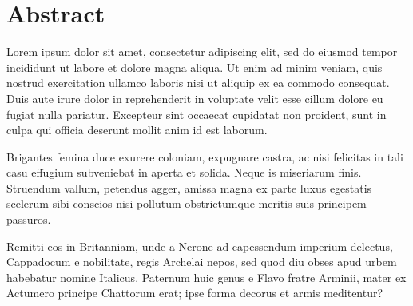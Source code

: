 \section*{\centering Abstract}
\vspace{5mm}

Lorem ipsum dolor sit amet, consectetur adipiscing elit, sed do eiusmod tempor incididunt ut labore et dolore magna aliqua. Ut enim ad minim veniam, quis nostrud exercitation ullamco laboris nisi ut aliquip ex ea commodo consequat. Duis aute irure dolor in reprehenderit in voluptate velit esse cillum dolore eu fugiat nulla pariatur. Excepteur sint occaecat cupidatat non proident, sunt in culpa qui officia deserunt mollit anim id est laborum.

Brigantes femina duce exurere coloniam, expugnare castra, ac nisi felicitas in tali casu effugium subveniebat in aperta et solida. Neque is miseriarum finis. Struendum vallum, petendus agger, amissa magna ex parte luxus egestatis scelerum sibi conscios nisi pollutum obstrictumque meritis suis principem passuros.

Remitti eos in Britanniam, unde a Nerone ad capessendum imperium delectus, Cappadocum e nobilitate, regis Archelai nepos, sed quod diu obses apud urbem habebatur nomine Italicus. Paternum huic genus e Flavo fratre Arminii, mater ex Actumero principe Chattorum erat; ipse forma decorus et armis meditentur?
